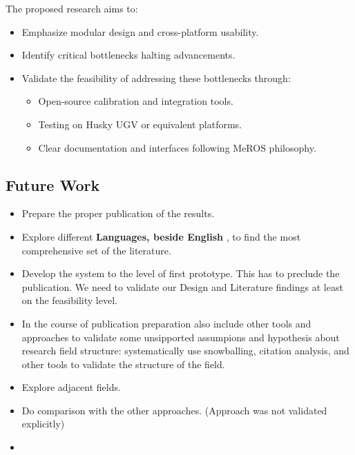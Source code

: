 \documentclass[runningheads]{llncs}
\begin{document}
The proposed research aims to:
\begin{itemize}
  \item Emphasize modular design and cross-platform usability.
  \item Identify critical bottlenecks halting advancements.
  \item Validate the feasibility of addressing these bottlenecks through:
        \begin{itemize}
          \item Open-source calibration and integration tools.
          \item Testing on Husky UGV or equivalent platforms.
          \item Clear documentation and interfaces following MeROS philosophy.
        \end{itemize}
\end{itemize}


\subsection{Future Work}

\begin{itemize}

  \item Prepare the proper publication of the results.
  \item Explore different \textbf{ Languages, beside English }, to find the most comprehensive set of the literature.
  \item Develop the system to the level of first prototype. This has to preclude the publication. We need to validate our Design and Literature findings at least on the feasibility level.
  \item In the course of publication preparation also include other tools and approaches to validate some unsipported assumpions and hypothesis about research field structure: systematically use snowballing, citation analysis, and other tools to validate the structure of the field.
  \item Explore adjacent fields.
  \item Do comparison with the other approaches. (Approach was not validated explicitly)
  \item
\end{itemize}


\printbibliography
\end{document}
